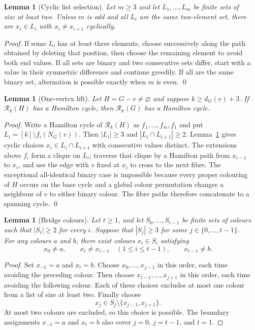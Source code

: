 \documentclass[11pt]{article}
\newtheorem{lemma}[theorem]{Lemma}
\theoremstyle{remark}
\newcommand{\Rk}{\mathcal R_k}
\numberwithin{equation}{section}
\begin{document}
\begin{lemma}[Cyclic list selection]
\label{lem:list-cycle}
Let $m\ge3$ and let $L_1,\ldots,L_m$ be finite sets of size at least two.  Unless $m$ is odd and all $L_i$ are the same two-element set, there are $x_i\in L_i$ with $x_i\ne x_{i+1}$ cyclically.
\end{lemma}

\begin{proof}
If some $L_i$ has at least three elements, choose successively along the path obtained by deleting that position, then choose the remaining element to avoid both end values.  If all sets are binary and two consecutive sets differ, start with a value in their symmetric difference and continue greedily.  If all are the same binary set, alternation is possible exactly when $m$ is even. \qed
\end{proof}

\begin{lemma}[One-vertex lift]
\label{lem:single-lift}
Let $H=G-v\ne\varnothing$ and suppose $k\ge d_G(v)+3$.  If $\Rk(H)$ has a Hamilton cycle, then $\Rk(G)$ has a Hamilton cycle.
\end{lemma}

\begin{proof}
Write a Hamilton cycle of $\Rk(H)$ as $f_1,\ldots,f_m,f_1$ and put $L_i=[k]\setminus f_i(N_G(v))$.  Then $|L_i|\ge3$ and $|L_i\cap L_{i+1}|\ge2$.  Lemma~\ref{lem:list-cycle} gives cyclic choices $x_i\in L_i\cap L_{i+1}$ with consecutive values distinct.  The extensions above $f_i$ form a clique on $L_i$; traverse that clique by a Hamilton path from $x_{i-1}$ to $x_i$, and use the edge with $v$ fixed at $x_i$ to cross to the next fibre.  The exceptional all-identical binary case is impossible because every proper colouring of $H$ occurs on the base cycle and a global colour permutation changes a neighbour of $v$ to either binary colour.  The fibre paths therefore concatenate to a spanning cycle. \qed
\end{proof}


\begin{lemma}[Bridge colours]\label{lem:bridge-colours}
Let $t\ge1$, and let $S_0,\ldots,S_{t-1}$ be finite sets of colours
such that $|S_i|\ge2$ for every $i$. Suppose that $|S_j|\ge3$ for
some $j\in\{0,\ldots,t-1\}$. For any colours $a$ and $b$, there exist
colours $x_i\in S_i$ satisfying
\[
x_0\ne a,\qquad
x_i\ne x_{i-1}\quad(1\le i\le t-1),\qquad
x_{t-1}\ne b.
\]
\end{lemma}

\begin{proof}
Set $x_{-1}=a$ and $x_t=b$. Choose $x_0,\ldots,x_{j-1}$ in this
order, each time avoiding the preceding colour. Then choose
$x_{t-1},\ldots,x_{j+1}$ in this order, each time avoiding the following
colour. Each of these choices excludes at most one colour from a list of
size at least two. Finally choose
\[
x_j\in S_j\setminus\{x_{j-1},x_{j+1}\}.
\]
At most two colours are excluded, so this choice is possible. The
boundary assignments $x_{-1}=a$ and $x_t=b$ also cover $j=0$,
$j=t-1$, and $t=1$.
\end{proof}
\end{document}

